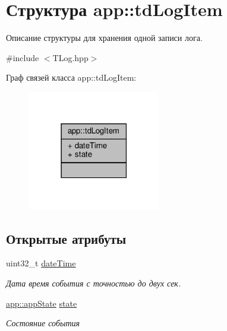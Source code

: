 \hypertarget{structapp_1_1td_log_item}{}\section{Структура app\+:\+:td\+Log\+Item}
\label{structapp_1_1td_log_item}


Описание структуры для хранения одной записи лога.  




{\ttfamily \#include $<$T\+Log.\+hpp$>$}



Граф связей класса app\+:\+:td\+Log\+Item\+:\nopagebreak
\begin{figure}[H]
\begin{center}
\leavevmode
\includegraphics[width=162pt]{structapp_1_1td_log_item__coll__graph}
\end{center}
\end{figure}
\subsection*{Открытые атрибуты}
\begin{DoxyCompactItemize}
\item 
\mbox{\label{structapp_1_1td_log_item_a5cb3959fafb84783a88a840f8427e4e6}} 
uint32\+\_\+t \hyperlink{structapp_1_1td_log_item_a5cb3959fafb84783a88a840f8427e4e6}{date\+Time}
\begin{DoxyCompactList}\small\item\em Дата время события с точностью до двух сек. \end{DoxyCompactList}\item 
\mbox{\label{structapp_1_1td_log_item_ade62dcc4582ad2247c47a3e68889d118}} 
\hyperlink{group___xD0_x9F_xD0_xB5_xD1_x80_xD0_xB5_xD1_x87_xD0_xB8_xD1_x81_xD0_xBB_xD0_xB5_xD0_xBD_xD0_xB8_xD1_x8F_ga290e8080c661e52c2f685fd4af148acf}{app\+::app\+State} \hyperlink{structapp_1_1td_log_item_ade62dcc4582ad2247c47a3e68889d118}{state}
\begin{DoxyCompactList}\small\item\em Состояние события \end{DoxyCompactList}\end{DoxyCompactItemize}


